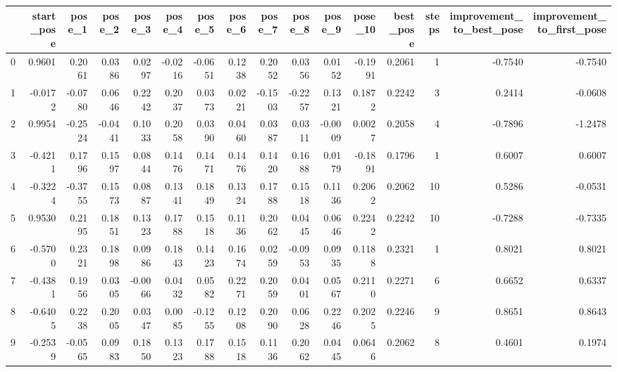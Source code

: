 \begin{tabular}{lrrrrrrrrrrrrrrr}
\toprule
{} &  start\_pose &  pose\_1 &  pose\_2 &  pose\_3 &  pose\_4 &  pose\_5 &  pose\_6 &  pose\_7 &  pose\_8 &  pose\_9 &  pose\_10 &  best\_pose &  steps &  improvement\_to\_best\_pose &  improvement\_to\_first\_pose \\
\midrule
0  &      0.9601 &  0.2061 &  0.0386 &  0.0297 & -0.0216 & -0.0651 &  0.1238 &  0.2052 &  0.0356 &  0.0152 &  -0.1991 &     0.2061 &      1 &                   -0.7540 &                    -0.7540 \\
1  &     -0.0172 & -0.0780 &  0.0646 &  0.2242 &  0.2037 &  0.0373 &  0.0221 & -0.1503 & -0.2257 &  0.1321 &   0.1872 &     0.2242 &      3 &                    0.2414 &                    -0.0608 \\
2  &      0.9954 & -0.2524 & -0.0441 &  0.1033 &  0.2058 &  0.0390 &  0.0460 &  0.0387 &  0.0311 & -0.0009 &   0.0027 &     0.2058 &      4 &                   -0.7896 &                    -1.2478 \\
3  &     -0.4211 &  0.1796 &  0.1597 &  0.0844 &  0.1476 &  0.1471 &  0.1476 &  0.1420 &  0.1688 &  0.0179 &  -0.1891 &     0.1796 &      1 &                    0.6007 &                     0.6007 \\
4  &     -0.3224 & -0.3755 &  0.1573 &  0.0887 &  0.1341 &  0.1849 &  0.1324 &  0.1788 &  0.1518 &  0.1136 &   0.2062 &     0.2062 &     10 &                    0.5286 &                    -0.0531 \\
5  &      0.9530 &  0.2195 &  0.1851 &  0.1323 &  0.1788 &  0.1518 &  0.1136 &  0.2062 &  0.0445 &  0.0646 &   0.2242 &     0.2242 &     10 &                   -0.7288 &                    -0.7335 \\
6  &     -0.5700 &  0.2321 &  0.1898 &  0.0986 &  0.1843 &  0.1423 &  0.1674 &  0.0259 & -0.0953 &  0.0935 &   0.1188 &     0.2321 &      1 &                    0.8021 &                     0.8021 \\
7  &     -0.4381 &  0.1956 &  0.0305 & -0.0066 &  0.0432 &  0.0582 &  0.2271 &  0.2059 &  0.0401 &  0.0567 &   0.2110 &     0.2271 &      6 &                    0.6652 &                     0.6337 \\
8  &     -0.6405 &  0.2238 &  0.2005 &  0.0347 &  0.0085 & -0.1255 &  0.1208 &  0.2090 &  0.0628 &  0.2246 &   0.2025 &     0.2246 &      9 &                    0.8651 &                     0.8643 \\
9  &     -0.2539 & -0.0565 &  0.0983 &  0.1850 &  0.1323 &  0.1788 &  0.1518 &  0.1136 &  0.2062 &  0.0445 &   0.0646 &     0.2062 &      8 &                    0.4601 &                     0.1974 \\

\end{tabular}
